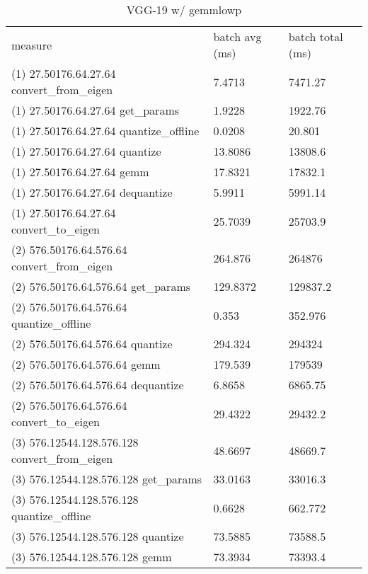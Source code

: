 \begin{longtable}{lll}
\caption{VGG-19 w/ gemmlowp}\\
measure                                          & batch avg (ms) & batch total (ms) \\
(1) 27.50176.64.27.64 convert\_from\_eigen       & 7.4713         & 7471.27          \\
(1) 27.50176.64.27.64 get\_params                & 1.9228         & 1922.76          \\
(1) 27.50176.64.27.64 quantize\_offline          & 0.0208         & 20.801           \\
(1) 27.50176.64.27.64 quantize                   & 13.8086        & 13808.6          \\
(1) 27.50176.64.27.64 gemm                       & 17.8321        & 17832.1          \\
(1) 27.50176.64.27.64 dequantize                 & 5.9911         & 5991.14          \\
(1) 27.50176.64.27.64 convert\_to\_eigen         & 25.7039        & 25703.9          \\
(2) 576.50176.64.576.64 convert\_from\_eigen     & 264.876        & 264876           \\
(2) 576.50176.64.576.64 get\_params              & 129.8372       & 129837.2         \\
(2) 576.50176.64.576.64 quantize\_offline        & 0.353          & 352.976          \\
(2) 576.50176.64.576.64 quantize                 & 294.324        & 294324           \\
(2) 576.50176.64.576.64 gemm                     & 179.539        & 179539           \\
(2) 576.50176.64.576.64 dequantize               & 6.8658         & 6865.75          \\
(2) 576.50176.64.576.64 convert\_to\_eigen       & 29.4322        & 29432.2          \\
(3) 576.12544.128.576.128 convert\_from\_eigen   & 48.6697        & 48669.7          \\
(3) 576.12544.128.576.128 get\_params            & 33.0163        & 33016.3          \\
(3) 576.12544.128.576.128 quantize\_offline      & 0.6628         & 662.772          \\
(3) 576.12544.128.576.128 quantize               & 73.5885        & 73588.5          \\
(3) 576.12544.128.576.128 gemm                   & 73.3934        & 73393.4          \\

\end{longtable}
